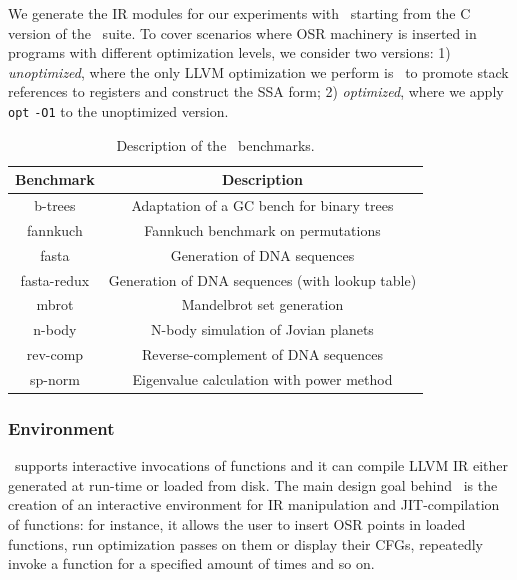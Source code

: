 We generate the IR modules for our experiments with \clang\ starting from the C version of the \shootout\ suite. To cover scenarios where OSR machinery is inserted in programs with different optimization levels, we consider two versions: 1) {\em unoptimized}, where the only LLVM optimization we perform is \memtoreg\ to promote stack references to registers and construct the SSA form; 2) {\em optimized}, where we apply {\tt opt} {\tt -O1} to the unoptimized version.

\begin{table}[!hb]
\begin{center}
\begin{small}
    \begin{tabular}{ |c|c| }
        \hline
        Benchmark & Description \\
        \hline
        \hline
        b-trees & Adaptation of a GC bench for binary trees \\
        \hline
        fannkuch & Fannkuch benchmark on permutations \\
        \hline
        fasta & Generation of DNA sequences \\
        \hline
        fasta-redux & Generation of DNA sequences (with lookup table) \\
        \hline
        mbrot & Mandelbrot set generation \\
        \hline
        n-body & N-body simulation of Jovian planets \\
        \hline
        rev-comp & Reverse-complement of DNA sequences \\
        \hline
        sp-norm & Eigenvalue calculation with power method \\
        \hline
    \end{tabular}
\end{small}
\end{center}
\caption{\label{tab:osr-shootout} Description of the \shootout\ benchmarks.}
\end{table}

\subsubsection*{Environment}
\tinyvm\ supports interactive invocations of functions and it can compile LLVM IR either generated at run-time or loaded from disk. The main design goal behind \tinyvm\ is the creation of an interactive environment for IR manipulation and JIT-compilation of functions: for instance, it allows the user to insert OSR points in loaded functions, run optimization passes on them or display their CFGs, repeatedly invoke a function for a specified amount of times and so on.

